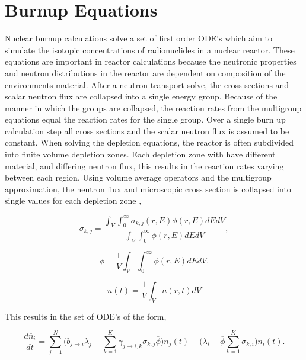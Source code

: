 \section{Burnup Equations}
Nuclear burnup calculations solve a set of first order ODE's which aim to simulate the isotopic concentrations of radionuclides in a nuclear reactor. These equations are important in reactor calculations because the neutronic properties and neutron distributions in the reactor are dependent on composition of the environments material. After a neutron transport solve, the cross sections and scalar neutron flux are collapsed into a single energy group. Because of the manner in which the groups are collapsed, the reaction rates from the multigroup equations equal the reaction rates for the single group. Over a single burn up calculation step all cross sections and the scalar neutron flux is assumed to be constant. When solving the depletion equations, the reactor is often subdivided into finite volume depletion zones. Each depletion zone with have different material, and differing neutron flux, this results in the reaction rates varying between each region. Using volume average operators and the multigroup approximation, the neutron flux and microscopic cross section is collapsed into single values for each depletion zone \cite{aarnoThesis},

\begin{equation}
    \overline{\sigma}_{k,j} = \frac{\int_{V}\int_{0}^{\infty}\sigma_{k,j}(r,E)\phi(r,E) dEdV}{\int_{V}\int_{0}^{\infty}\phi(r,E) dEdV},
\end{equation}

\begin{equation}
    \overline{\phi} = \frac{1}{V}\int_{V}\int_{0}^{\infty}\phi(r,E)dEdV.
\end{equation}

\begin{equation}
    \overline{n}(t) = \frac{1}{V}\int_{V}n(r,t)dV
\end{equation}

\noindent This results in the set of ODE's of the form,

\begin{equation}
    \frac{d\overline{n}_{i}}{dt} = \sum_{j=1}^{N}\bigg(b_{j\rightarrow i}\lambda_{j} + 
    \sum_{k=1}^{K}\gamma_{j\rightarrow i,k}\overline{\sigma}_{k,j}\overline{\phi} \bigg)\overline{n}_{j}(t) - \bigg(\lambda_{i} + \overline{\phi}\sum_{k=1}^{K} \overline{\sigma}_{k,i}\bigg)\overline{n}_{i}(t).
    \label{eq:LWRDepletion}
\end{equation}

